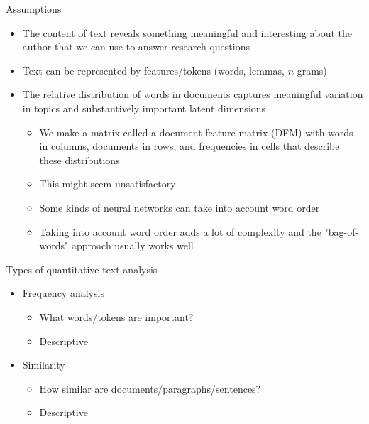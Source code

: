 \documentclass[pdf, 9pt, fleqn, handout]{beamer}
\begin{document}
\begin{frame}{Assumptions}
\begin{itemize}
\item The content of text reveals something meaningful and interesting about the author that we can use to answer research questions \\[1em]
\item Text can be represented by features/tokens (words, lemmas, $n$-grams) \\[1em]
\item The relative distribution of words in documents captures meaningful variation in topics and substantively important latent dimensions \\[0.5em]
\begin{itemize}
\item We make a matrix called a document feature matrix (DFM) with words in columns, documents in rows, and frequencies in cells that describe these distributions \\[1em]
\item This might seem unsatisfactory \\[1em]
\item Some kinds of neural networks can take into account word order \\[1em]
\item Taking into account word order adds a lot of complexity and the "bag-of-words" approach usually works well
\end{itemize}
\end{itemize}
\end{frame}

\begin{frame}{Types of quantitative text analysis}
\begin{itemize}
\item Frequency analysis\\[0.5em]
\begin{itemize}
\item What words/tokens are important? \\[0.5em]
\item Descriptive \\[2em]
\end{itemize}
\item Similarity\\[0.5em]
\begin{itemize}
\item How similar are documents/paragraphs/sentences?  \\[0.5em]
\item Descriptive  \\[1em]
\end{itemize}
\end{itemize}
\end{frame}
\end{document}
